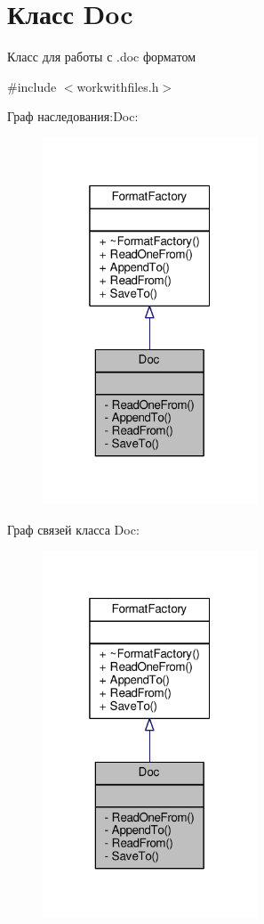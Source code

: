 \hypertarget{class_doc}{}\section{Класс Doc}
\label{class_doc}


Класс для работы с .doc форматом  




{\ttfamily \#include $<$workwithfiles.\+h$>$}



Граф наследования\+:Doc\+:\nopagebreak
\begin{figure}[H]
\begin{center}
\leavevmode
\includegraphics[width=181pt]{class_doc__inherit__graph}
\end{center}
\end{figure}


Граф связей класса Doc\+:\nopagebreak
\begin{figure}[H]
\begin{center}
\leavevmode
\includegraphics[width=181pt]{class_doc__coll__graph}
\end{center}
\end{figure}
